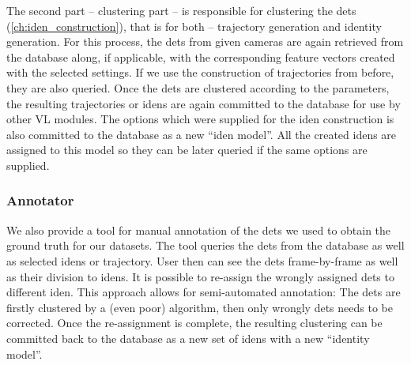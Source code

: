 The second part -- clustering part -- is responsible for clustering the \glspl{det} (\autoref{ch:iden_construction}), that is for both -- trajectory generation and identity generation. For this process, the \glspl{det} from given cameras are again retrieved from the database along, if applicable, with the corresponding feature vectors created with the selected settings. If we use the construction of trajectories from before, they are also queried. Once the \glspl{det} are clustered according to the parameters, the resulting trajectories or \glspl{iden} are again committed to the database for use by other \gls{VL} modules. The options which were supplied for the \gls{iden} construction is also committed to the database as a new ``\gls{iden} model''. All the created \glspl{iden} are assigned to this model so they can be later queried if the same options are supplied.

\subsubsection*{Annotator}
We also provide a tool for manual annotation of the \glspl{det} we used to obtain the ground truth for our datasets. The tool queries the \glspl{det} from the database as well as selected \glspl{iden} or trajectory. User then can see the \glspl{det} frame-by-frame as well as their division to \glspl{iden}. It is possible to re-assign the wrongly assigned \glspl{det} to different \gls{iden}. This approach allows for semi-automated annotation: The \glspl{det} are firstly clustered by a (even poor) algorithm, then only wrongly \glspl{det} needs to be corrected. Once the re-assignment is complete, the resulting clustering can be committed back to the database as a new set of \glspl{iden} with a new ``identity model''.

